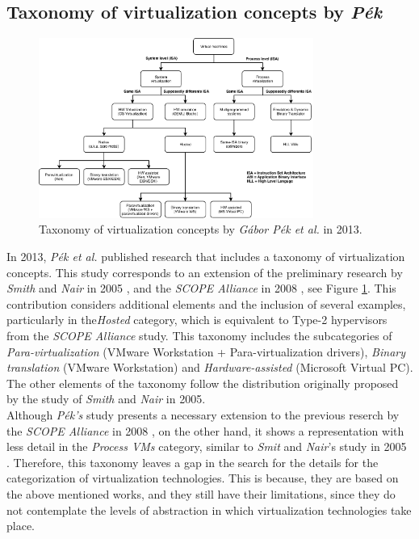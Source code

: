 	\subsection{Taxonomy of virtualization concepts by \textit{Pék}}
	
	\begin{figure}[!hbtp]
		\centering
		\includegraphics[width=9cm]{images/Pek2013.pdf}
		\vspace{-0.2cm}
		\caption{Taxonomy of virtualization concepts by \textit{Gábor Pék et al.} in 2013\footnotemark[9]{}.}
		\label{fig:TaxonomyOfVirtualizationConcepts}
	\end{figure}
	
	
	In 2013, \textit{Pék et al.} \cite{Pek2013} published research that includes a taxonomy of virtualization concepts. This study corresponds to an extension of the preliminary research by \textit{Smith} and \textit{Nair} in 2005 \cite{Smith2005}, and the \textit{SCOPE Alliance} in 2008 \cite {SCOPEAlliance2008}, see Figure \ref{fig:TaxonomyOfVirtualizationConcepts}. This contribution considers additional elements and the inclusion of several examples, particularly in the\textit{Hosted} category, which is equivalent to Type-2 hypervisors from the \textit{SCOPE Alliance} study. This taxonomy includes the subcategories of \textit{Para-virtualization} (VMware Workstation + Para-virtualization drivers), \textit{Binary translation} (VMware Workstation) and \textit{Hardware-assisted} (Microsoft Virtual PC). The other elements of the taxonomy follow the distribution originally proposed by the study of \textit{Smith} and \textit {Nair} in 2005. \\
	
	Although \textit{Pék's} study presents a necessary extension to the previous reserch by the \textit{SCOPE Alliance} in 2008 \cite{SCOPEAlliance2008}, on the other hand, it shows a representation with less detail in the \textit{Process VMs} category, similar to \textit{Smit} and \textit{Nair}'s study in 2005 \cite{Smith2005}. Therefore, this taxonomy leaves a gap in the search for the details for the categorization of virtualization technologies. This is because, they are based on the above mentioned works, and they still have their limitations, since they do not contemplate the levels of abstraction in which virtualization technologies take place.